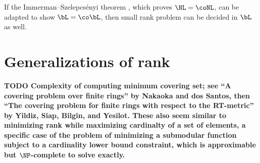 \documentclass{article}
\newcommand{\todo}[1]{\textbf{TODO #1}}
\begin{document}
If the Immerman–Szelepcsényi theorem \autocite{immerman88, szelepcsenyi88}, which proves $\NL = \coNL$, can be adapted to show $\bL = \co\bL$, then small rank problem can be decided in $\bL$ as well.

\section{Generalizations of rank}

\todo{Complexity of computing minimum covering set; see ``A covering problem over finite rings'' by Nakaoka and dos Santos, then ``The covering problem for finite rings with respect to the RT-metric'' by Yildiz, Siap, Bilgin, and Yesilot.
These also seem similar to minimizing rank while maximizing cardinalty of a set of elements, a specific case of the problem of minimizing a submodular function subject to a cardinality lower bound constraint, which is approximable but $\NP$-complete to solve exactly.}

\printbibliography
\end{document}
